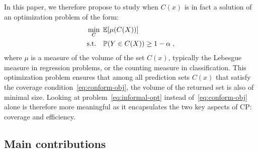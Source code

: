 In this paper, we therefore propose to study when $C(x)$ is in fact a solution of an optimization problem of the form:
%
\begin{align}
	&\min_{C} \; {\mathbb{E}}[\mu(C(X))] \label{eq:informal-opt} \\
	&\text{s.t.} \quad {\mathbb{P}}(Y\in C(X)) \geq 1-\alpha \;, \nonumber
\end{align}
%
where $\mu$ is a measure of the volume of the set $C(x)$, typically the Lebesgue measure in regression problems, or the counting measure in classification. This optimization problem ensures that among all prediction sets $C(x)$ that satisfy the coverage condition~\eqref{eq:conform-obj}, the volume of the returned set is also of minimal size. Looking at problem~\eqref{eq:informal-opt} instead of~\eqref{eq:conform-obj} alone is therefore more meaningful as it encapsulates the two key aspects of CP: coverage and efficiency. %

\subsection{Main contributions}

